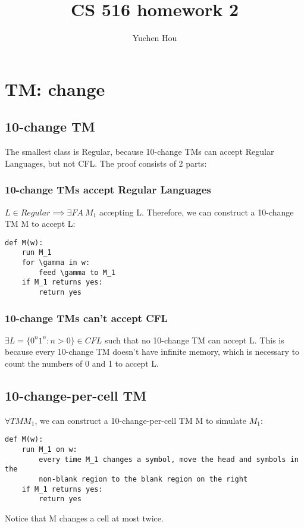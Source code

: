 \documentclass{article}
\begin{document}
\lstset{language=python, tabsize=4}
\title{CS 516 homework 2}
\author{Yuchen Hou}
\maketitle

\section{TM: change}

\subsection{10-change TM}

The smallest class is Regular, because 10-change TMs can accept Regular Languages, but not CFL. The proof consists of 2 parts:

\subsubsection{10-change TMs accept Regular Languages}

$ L \in Regular \implies \exists FA \ M_1 $ accepting L. Therefore, we can construct a 10-change TM M to accept L:
\begin{lstlisting}
def M(w):
	run M_1
	for \gamma in w:
		feed \gamma to M_1
	if M_1 returns yes:
		return yes
\end{lstlisting}

\subsubsection{10-change TMs can't accept CFL}

$ \exists L = \{0^n1^n: n > 0\} \in CFL $ such that no 10-change TM can accept L. This is because every 10-change TM doesn't have infinite memory, which is necessary to count the numbers of 0 and 1 to accept L.

\subsection{10-change-per-cell TM}

$ \forall TM M_1 $, we can construct a 10-change-per-cell TM M to simulate $ M_1 $:
\begin{lstlisting}
def M(w):
	run M_1 on w:
		every time M_1 changes a symbol, move the head and symbols in the
		non-blank region to the blank region on the right
	if M_1 returns yes:
		return yes
\end{lstlisting}
Notice that M changes a cell at most twice.
\end{document}
